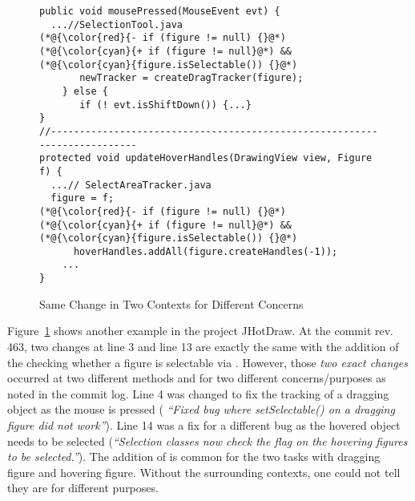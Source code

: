\begin{figure}[t]
	\centering
	\begin{lstlisting}[]
public void mousePressed(MouseEvent evt) { 
  ...//SelectionTool.java
(*@{\color{red}{- if (figure != null) {}@*)
(*@{\color{cyan}{+ if (figure != null}@*) && (*@{\color{cyan}{figure.isSelectable()) {}@*)
       newTracker = createDragTracker(figure);
    } else {
       if (! evt.isShiftDown()) {...}
}
//--------------------------------------------------------------------------
protected void updateHoverHandles(DrawingView view, Figure f) {
  ...// SelectAreaTracker.java
  figure = f;
(*@{\color{red}{- if (figure != null) {}@*)
(*@{\color{cyan}{+ if (figure != null}@*) && (*@{\color{cyan}{figure.isSelectable()) {}@*)
      hoverHandles.addAll(figure.createHandles(-1));
    ...
}
	\end{lstlisting}
        \vspace{-15pt}
        \caption{Same Change in Two Contexts for Different Concerns}
        \vspace{-6pt}
        \label{fig:motiv-context}
\end{figure}

Figure~\ref{fig:motiv-context} shows another example in the project
JHotDraw. At the commit rev. 463, two changes at line 3 and line 13
are exactly the same with the addition of the checking whether a
figure is selectable via . However, those
{\em two exact changes} occurred at two different methods
 and  for two different
concerns/purposes as noted in the commit log. Line 4 was changed to
fix the tracking of a dragging object as the mouse is pressed ({\em
  ``Fixed bug where setSelectable() on a dragging figure did not
  work''}).  Line 14 was a fix for a different bug as the hovered
object needs to be selected ({\em ``Selection classes now check the
  flag on the hovering figures to be selected.''}). The addition of
 is common for the two tasks with dragging
figure and hovering figure. Without the surrounding contexts, one
could not tell they are for different purposes.

